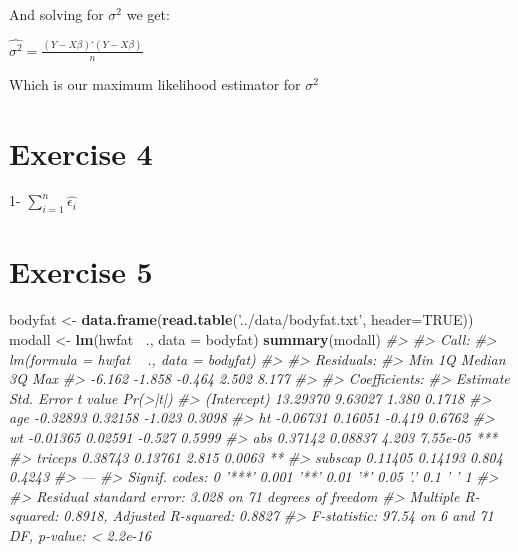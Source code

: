 \documentclass[]{article}
\newenvironment{Shaded}{\begin{snugshade}}{\end{snugshade}}
\newcommand{\CommentTok}[1]{\textcolor[rgb]{0.56,0.35,0.01}{\textit{#1}}}
\newcommand{\DataTypeTok}[1]{\textcolor[rgb]{0.13,0.29,0.53}{#1}}
\newcommand{\KeywordTok}[1]{\textcolor[rgb]{0.13,0.29,0.53}{\textbf{#1}}}
\newcommand{\NormalTok}[1]{#1}
\newcommand{\OperatorTok}[1]{\textcolor[rgb]{0.81,0.36,0.00}{\textbf{#1}}}
\newcommand{\OtherTok}[1]{\textcolor[rgb]{0.56,0.35,0.01}{#1}}
\newcommand{\StringTok}[1]{\textcolor[rgb]{0.31,0.60,0.02}{#1}}
\begin{document}
And solving for \(\sigma^{2}\) we get:

\(\hat{\sigma^{2}} = \frac{(Y - X \beta) \prime (Y - X \beta)}{n}\)

Which is our maximum likelihood estimator for \(\sigma^2\)

\newpage

\hypertarget{exercise-4}{%
\section{Exercise 4}\label{exercise-4}}

1- \(\sum_{i=1}^n \hat{\epsilon_i}\)

\newpage

\hypertarget{exercise-5}{%
\section{Exercise 5}\label{exercise-5}}

\begin{Shaded}
\begin{Highlighting}[]
\NormalTok{bodyfat <-}\StringTok{ }\KeywordTok{data.frame}\NormalTok{(}\KeywordTok{read.table}\NormalTok{(}\StringTok{'../data/bodyfat.txt'}\NormalTok{, }\DataTypeTok{header=}\OtherTok{TRUE}\NormalTok{))}
\NormalTok{modall <-}\StringTok{ }\KeywordTok{lm}\NormalTok{(hwfat }\OperatorTok{~}\NormalTok{., }\DataTypeTok{data =}\NormalTok{ bodyfat)}
\KeywordTok{summary}\NormalTok{(modall)}
\CommentTok{#> }
\CommentTok{#> Call:}
\CommentTok{#> lm(formula = hwfat ~ ., data = bodyfat)}
\CommentTok{#> }
\CommentTok{#> Residuals:}
\CommentTok{#>    Min     1Q Median     3Q    Max }
\CommentTok{#> -6.162 -1.858 -0.464  2.502  8.177 }
\CommentTok{#> }
\CommentTok{#> Coefficients:}
\CommentTok{#>             Estimate Std. Error t value Pr(>|t|)    }
\CommentTok{#> (Intercept) 13.29370    9.63027   1.380   0.1718    }
\CommentTok{#> age         -0.32893    0.32158  -1.023   0.3098    }
\CommentTok{#> ht          -0.06731    0.16051  -0.419   0.6762    }
\CommentTok{#> wt          -0.01365    0.02591  -0.527   0.5999    }
\CommentTok{#> abs          0.37142    0.08837   4.203 7.55e-05 ***}
\CommentTok{#> triceps      0.38743    0.13761   2.815   0.0063 ** }
\CommentTok{#> subscap      0.11405    0.14193   0.804   0.4243    }
\CommentTok{#> ---}
\CommentTok{#> Signif. codes:  0 '***' 0.001 '**' 0.01 '*' 0.05 '.' 0.1 ' ' 1}
\CommentTok{#> }
\CommentTok{#> Residual standard error: 3.028 on 71 degrees of freedom}
\CommentTok{#> Multiple R-squared:  0.8918, Adjusted R-squared:  0.8827 }
\CommentTok{#> F-statistic: 97.54 on 6 and 71 DF,  p-value: < 2.2e-16}
\end{Highlighting}
\end{Shaded}
\end{document}
